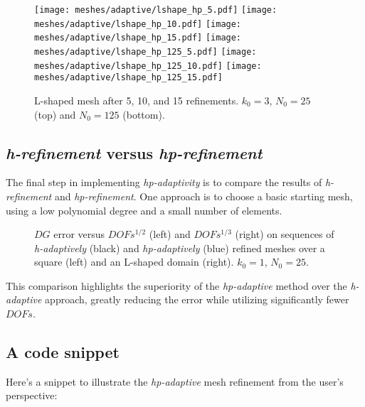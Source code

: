 \begin{figure}[!ht]
	\centering
	\texttt{[image: meshes/adaptive/lshape\_hp\_5.pdf]}
	\texttt{[image: meshes/adaptive/lshape\_hp\_10.pdf]}
	\texttt{[image: meshes/adaptive/lshape\_hp\_15.pdf]}
    \texttt{[image: meshes/adaptive/lshape\_hp\_125\_5.pdf]}
	\texttt{[image: meshes/adaptive/lshape\_hp\_125\_10.pdf]}
	\texttt{[image: meshes/adaptive/lshape\_hp\_125\_15.pdf]}
	\caption{L-shaped mesh after 5, 10, and 15 refinements. $k_0 = 3$, $N_0 = 25$ (top) and $N_0 = 125$ (bottom).}
\end{figure}

\newpage
\subsection{\textit{h-refinement} versus \textit{hp-refinement}}

The final step in implementing \textit{hp-adaptivity} is to compare the results of \textit{h-refinement} and \textit{hp-refinement}. One approach is to choose a basic starting mesh, using a low polynomial degree and a small number of elements.

\begin{figure}[!ht]
    \begin{subfigure}[b]{0.45\textwidth}
		
	\end{subfigure}
	\hfill
	\begin{subfigure}[b]{0.45\textwidth}
		
	\end{subfigure}
    \caption{$DG$ error versus $DOFs^{1/2}$ (left) and $DOFs^{1/3}$ (right) on sequences of \textit{h-adaptively} (black) and \textit{hp-adaptively} (blue) refined meshes over a square (left) and an L-shaped domain (right). $k_0 = 1$, $N_0 = 25$.}
\end{figure}

This comparison highlights the superiority of the \textit{hp-adaptive} method over the \textit{h-adaptive} approach, greatly reducing the error while utilizing significantly fewer $DOFs$.

\newpage
\subsection{A code snippet}

Here's a snippet to illustrate the \textit{hp-adaptive} mesh refinement from the user's perspective:

